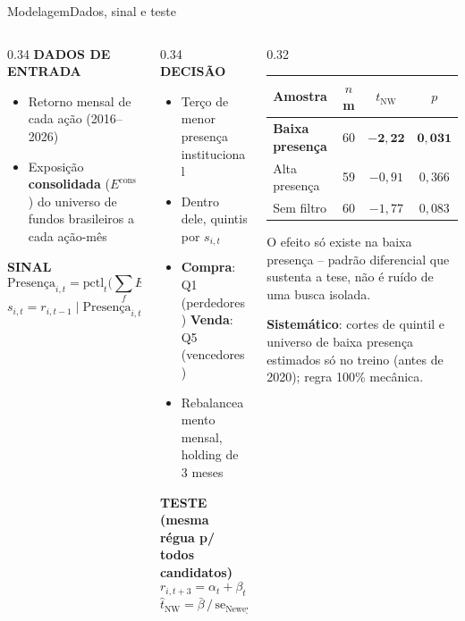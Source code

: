\documentclass[aspectratio=169,9pt]{beamer}
\let\olditem\item
\renewcommand\item{\olditem\vspace{0.5pt}}
\newcommand{\crit}[1]{{\scriptsize\color{gold}\textbf{#1}}}
\begin{document}
\begin{frame}{Modelagem}{Dados, sinal e teste}
\begin{columns}[T]
\begin{column}{0.34\textwidth}
\crit{DADOS DE ENTRADA}
\begin{itemize}
\item Retorno mensal de cada ação (2016--2026)
\item Exposição \textbf{consolidada} ($E^{\text{cons}}$) do universo de fundos
  brasileiros a cada ação-mês
\end{itemize}
\crit{SINAL}
\[
\text{Presença}_{i,t} = \text{pctl}_t\Big(\textstyle\sum_f E^{\text{cons}}_{f,i,t}\Big)
\]
\[
s_{i,t} = r_{i,t-1} \;\Big|\; \text{Presença}_{i,t}\le p_{33}
\]
\end{column}
\begin{column}{0.34\textwidth}
\crit{DECISÃO}
\begin{itemize}
\item Terço de menor presença institucional
\item Dentro dele, quintis por $s_{i,t}$
\item \textbf{Compra}: Q1 (perdedores) \quad\textbf{Venda}: Q5 (vencedores)
\item Rebalanceamento mensal, holding de 3 meses
\end{itemize}
\crit{TESTE (mesma régua p/ todos candidatos)}
\[
r_{i,t+3} = \alpha_t + \beta_t\, s_{i,t} + \varepsilon_{i,t} \;\; \text{(mês a mês)}
\]
\[
\hat t_{\text{NW}} = \bar\beta \,/\, \text{se}_{\text{Newey--West}}(\bar\beta)
\]
\end{column}
\begin{column}{0.32\textwidth}
\begin{center}
\scriptsize
\begin{tabular}{lccc}
\toprule
Amostra & $n$m & $t_{\text{NW}}$ & $p$ \\
\midrule
\textbf{Baixa presença} & 60 & $\mathbf{-2{,}22}$ & $\mathbf{0{,}031}$ \\
Alta presença & 59 & $-0{,}91$ & $0{,}366$ \\
Sem filtro & 60 & $-1{,}77$ & $0{,}083$ \\
\bottomrule
\end{tabular}
\end{center}
\vspace{4pt}
\footnotesize O efeito só existe na baixa presença -- padrão diferencial que
sustenta a tese, não é ruído de uma busca isolada.

\vspace{4pt}
\footnotesize\textbf{Sistemático}: cortes de quintil e universo de baixa
presença estimados só no treino (antes de 2020); regra 100\% mecânica.
\end{column}
\end{columns}
\end{frame}
\end{document}
